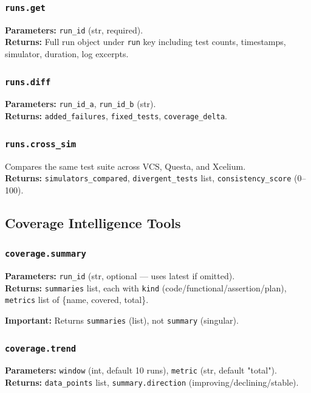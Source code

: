 \documentclass[11pt,a4paper]{article}
\begin{document}
\subsubsection{\texttt{runs.get}}
\textbf{Parameters:} \texttt{run\_id} (str, required).\\
\textbf{Returns:} Full run object under \texttt{run} key including test counts, timestamps,
simulator, duration, log excerpts.

\subsubsection{\texttt{runs.diff}}
\textbf{Parameters:} \texttt{run\_id\_a}, \texttt{run\_id\_b} (str).\\
\textbf{Returns:} \texttt{added\_failures}, \texttt{fixed\_tests}, \texttt{coverage\_delta}.

\subsubsection{\texttt{runs.cross\_sim}}
Compares the same test suite across VCS, Questa, and Xcelium.\\
\textbf{Returns:} \texttt{simulators\_compared}, \texttt{divergent\_tests} list,
\texttt{consistency\_score} (0--100).

\subsection{Coverage Intelligence Tools}

\subsubsection{\texttt{coverage.summary}}
\textbf{Parameters:} \texttt{run\_id} (str, optional — uses latest if omitted).\\
\textbf{Returns:} \texttt{summaries} list, each with \texttt{kind} (code/functional/assertion/plan),
\texttt{metrics} list of \{name, covered, total\}.

\textbf{Important:} Returns \texttt{summaries} (list), not \texttt{summary} (singular).

\subsubsection{\texttt{coverage.trend}}
\textbf{Parameters:} \texttt{window} (int, default 10 runs), \texttt{metric} (str, default "total").\\
\textbf{Returns:} \texttt{data\_points} list, \texttt{summary.direction} (improving/declining/stable).
\end{document}
